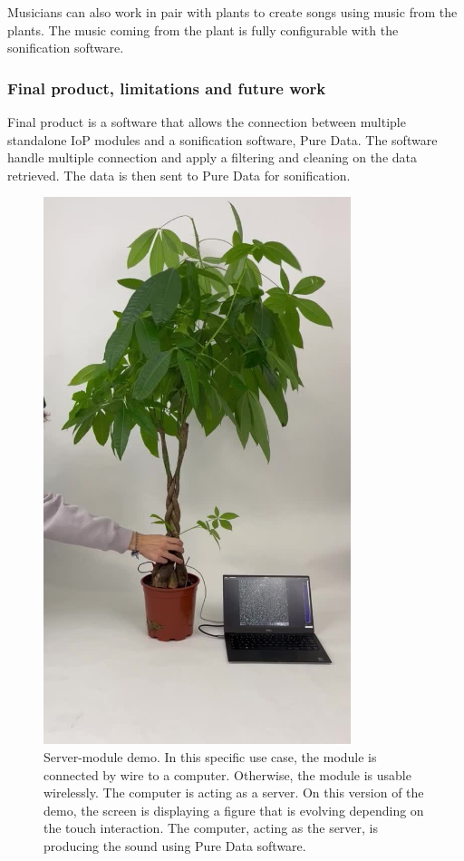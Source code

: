 Musicians can also work in pair with plants to create songs using music from the plants.
The music coming from the plant is fully configurable with the sonification software.


\subsubsection{Final product, limitations and future work}

Final product is a software that allows the connection between multiple standalone IoP modules and a sonification
software, Pure Data. The software handle multiple connection and apply a filtering and cleaning on the data 
retrieved. The data is then sent to Pure Data for sonification.

\begin{figure}[h!]
    \centering
    \includegraphics[width=0.8\textwidth]{images/standalone_demo.jpg}
    \caption{Server-module demo. In this specific use case, the module is connected by wire to a computer.
    Otherwise, the module is usable wirelessly. 
    The computer is acting as a server.
    On this version of the demo, the screen is displaying a figure that is evolving depending on the touch interaction.
    The computer, acting as the server, is producing the sound using Pure Data software.} 
    \vspace{0.1cm}
    \label{fig:standalone_demo}
\end{figure}


